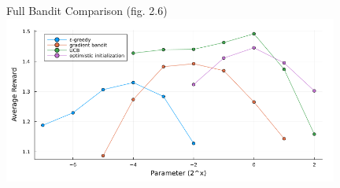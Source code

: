 \documentclass{beamer}
\begin{document}
\begin{frame}{Full Bandit Comparison (fig. 2.6)}
	\includegraphics[width=11cm]{ten_armed_testbed_comparison.png}
\end{frame}
  
  
  
\end{document}
